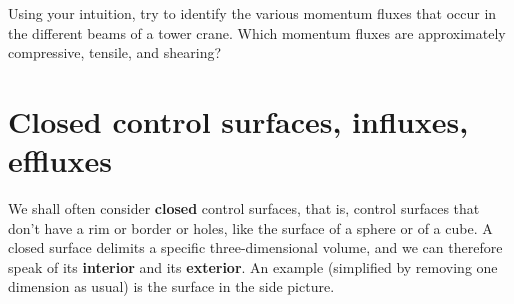 \documentclass[a4paper,12pt,%
onecolumn,oneside,%
british%
]{memoir}
\renewcommand*{\|}[1][]{\nonscript\:#1\vert\nonscript\:\mathopen{}}
\begin{document}
\begin{exercise}
  Using your intuition, try to identify the various momentum fluxes that occur in the different beams of a tower crane. Which momentum fluxes are approximately compressive, tensile, and shearing?
\end{exercise}



\section{Closed control surfaces, influxes, effluxes}
\label{sec:in_out_flux}

We shall often consider \textbf{closed} control surfaces, that is, control surfaces that don't have a rim or border or holes, like the surface of a sphere or of a cube. A closed surface delimits a specific three-dimensional volume, and we can therefore speak of its \textbf{interior} and its \textbf{exterior}. An example (simplified by removing one dimension as usual) is the surface in the side picture. 

\end{document}
